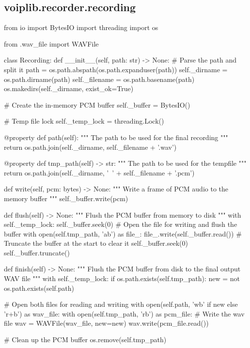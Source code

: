 \subsection{voiplib.recorder.recording}
\begin{pythoncode}
from io import BytesIO
import threading
import os

from .wav_file import WAVFile


class Recording:
    def __init__(self, path: str) -> None:
        # Parse the path and split it
        path = os.path.abspath(os.path.expanduser(path))
        self._dirname = os.path.dirname(path)
        self._filename = os.path.basename(path)
        os.makedirs(self._dirname, exist_ok=True)

        # Create the in-memory PCM buffer
        self._buffer = BytesIO()

        # Temp file lock
        self._temp_lock = threading.Lock()

    @property
    def path(self):
        """
        The path to be used for the final recording
        """
        return os.path.join(self._dirname, self._filename + '.wav')
    
    @property
    def tmp_path(self) -> str:
        """
        The path to be used for the tempfile
        """
        return os.path.join(self._dirname, '~' + self._filename + '.pcm')
    
    def write(self, pcm: bytes) -> None:
        """
        Write a frame of PCM audio to the memory buffer
        """
        self._buffer.write(pcm)
    
    def flush(self) -> None:
        """
        Flush the PCM buffer from memory to disk
        """
        with self._temp_lock:
            self._buffer.seek(0)
            # Open the file for writing and flush the buffer
            with open(self.tmp_path, 'ab') as file_:
                file_.write(self._buffer.read())
            # Truncate the buffer at the start to clear it
            self._buffer.seek(0)
            self._buffer.truncate()
        
    def finish(self) -> None:
        """
        Flush the PCM buffer from disk to the final output WAV file
        """
        with self._temp_lock:
            if os.path.exists(self.tmp_path):
                new = not os.path.exists(self.path)

                # Open both files for reading and writing
                with open(self.path, 'wb' if new else 'r+b') as wav_file:
                    with open(self.tmp_path, 'rb') as pcm_file:
                        # Write the wav file
                        wav = WAVFile(wav_file, new=new)
                        wav.write(pcm_file.read())

                # Clean up the PCM buffer
                os.remove(self.tmp_path)
\end{pythoncode}
